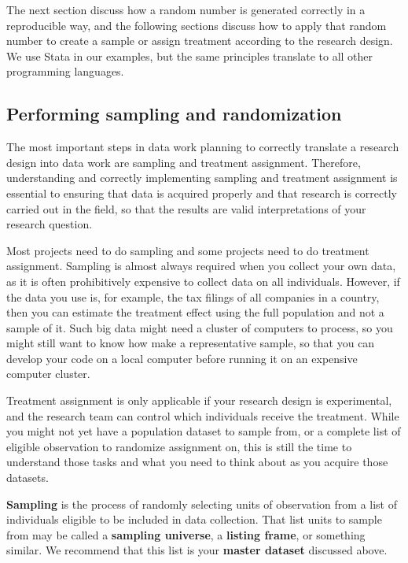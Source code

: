 The next section discuss how a random number
is generated correctly in a reproducible way,
and the following sections discuss how to
apply that random number to create a sample or assign treatment
according to the research design.
We use Stata in our examples,
but the same principles translate to all other programming languages.


\subsection{Performing sampling and randomization}

The most important steps in data work planning
to correctly translate a research design into data work
are sampling and treatment assignment.
Therefore, understanding and correctly implementing sampling and treatment assignment
is essential to ensuring that data is acquired properly and that research
is correctly carried out in the field, so that the results
are valid interpretations of your research question.

Most projects need to do sampling and some projects need to do treatment assignment.
Sampling is almost always required when you collect your own data,
as it is often prohibitively expensive to collect data on all individuals.
However, if the data you use is, for example,
the tax filings of all companies in a country,
then you can estimate the treatment effect
using the full population and not a sample of it.
Such big data might need a cluster of computers to process,
so you might still want to know how make a representative sample,
so that you can develop your code on a local computer
before running it on an expensive computer cluster.

Treatment assignment is only applicable if your research design is experimental,
and the research team can control which individuals receive the treatment.
While you might not yet have a population dataset to sample from,
or a complete list of eligible observation to randomize assignment on,
this is still the time to understand those tasks
and what you need to think about as you acquire those datasets.

\textbf{Sampling} is the process of randomly selecting units of observation
from a list of individuals eligible to be included in data collection.
That list units to sample from may be called a \textbf{sampling universe},
a \textbf{listing frame}, or something similar.
We recommend that this list is your \textbf{master dataset} discussed above.

